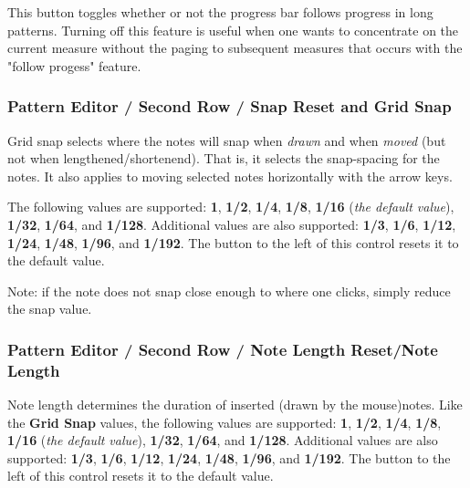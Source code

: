    This button toggles whether or not the progress bar follows
   progress in long patterns.  Turning off this feature is useful when
   one wants to concentrate on the current measure without the paging to
   subsequent measures that occurs with the "follow progess" feature.

\subsubsection{Pattern Editor / Second Row / Snap Reset and Grid Snap}
\label{subsubsec:pattern_editor_second_row_grid_snap}

   Grid snap selects where the notes will snap when
   \textsl{drawn} and when \textsl{moved} (but not when lengthened/shortenend).
   That is, it selects the snap-spacing for the notes.
   It also applies to moving selected notes horizontally with the
   arrow keys.

   The following values are supported:
   \textbf{1}, \textbf{1/2}, \textbf{1/4}, \textbf{1/8},
   \textbf{1/16} (\textsl{the default value}),
   \textbf{1/32}, \textbf{1/64}, and \textbf{1/128}.
   Additional values are also supported:
   \textbf{1/3}, \textbf{1/6}, \textbf{1/12}, \textbf{1/24},
   \textbf{1/48}, \textbf{1/96}, and \textbf{1/192}.
   The button to the left of this control resets it to the default value.

   Note: if the note does not snap close enough to where one clicks,
   simply reduce the snap value.

\subsubsection{Pattern Editor / Second Row / Note Length Reset/Note Length}
\label{subsubsec:pattern_editor_second_row_note_length}

   Note length determines the duration of inserted (drawn by the mouse)notes.
   Like the \textbf{Grid Snap} values,
   the following values are supported:
   \textbf{1}, \textbf{1/2}, \textbf{1/4}, \textbf{1/8},
   \textbf{1/16} (\textsl{the default value}),
   \textbf{1/32}, \textbf{1/64}, and \textbf{1/128}.
   Additional values are also supported:
   \textbf{1/3}, \textbf{1/6}, \textbf{1/12}, \textbf{1/24},
   \textbf{1/48}, \textbf{1/96}, and \textbf{1/192}.
   The button to the left of this control resets it to the default value.

